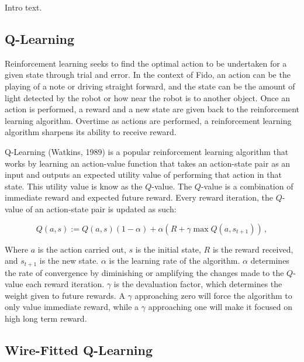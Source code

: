 Intro text.

\subsection{Q-Learning}

Reinforcement learning seeks to find the optimal action to be undertaken for a given state through trial and error. In the context of Fido, an action can be the playing of a note or driving straight forward, and the state can be the amount of light detected by the robot or how near the robot is to another object. Once an action is performed, a reward and a new state are given back to the reinforcement learning algorithm. Overtime as actions are performed, a reinforcement learning algorithm sharpens its ability to receive reward.

Q-Learning (Watkins, 1989) is a popular reinforcement learning algorithm that works by learning an action-value function that takes an action-state pair as an input and outputs an expected utility value of performing that action in that state. This utility value is know as the $Q$-value. The $Q$-value is a combination of immediate reward and expected future reward. Every reward iteration, the $Q$-value of an action-state pair is updated as such:

\begin{equation}
	Q(a, s) := Q(a, s)(1 - \alpha) + \alpha(R + \gamma \max Q(a, s_{t+1}))
	\,,
\end{equation}

Where $a$ is the action carried out, $s$ is the initial state, $R$ is the reward received, and $s_{t+1}$ is the new state. $\alpha$ is the learning rate of the algorithm. $\alpha$ determines the rate of convergence by diminishing or amplifying the changes made to the $Q$-value each reward iteration. $\gamma$ is the devaluation factor, which determines the weight given to future rewards. A $\gamma$ approaching zero will force the algorithm to only value immediate reward, while a $\gamma$ approaching one will make it focused on high long term reward.

\subsection{Wire-Fitted Q-Learning}
